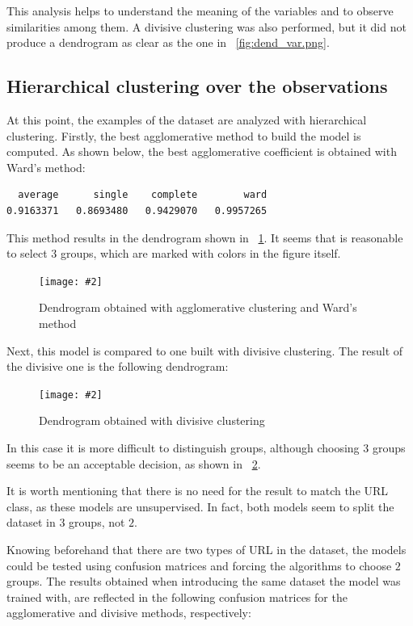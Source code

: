 \documentclass[12pt, a4paper]{article}
\newcommand*{\figref}[1]{\figurename~\ref{fig:#1}}
\newcommand{\figcaption}[4][H]{
  \begin{figure}[#1]
    \centering
    \texttt{[image: \#2]}
    \caption{#3}
    \label{fig:#2}
  \end{figure}
}
\begin{document}
      This analysis helps to understand the meaning of the variables and to observe similarities among them. A divisive clustering was also performed, but it did not produce a dendrogram as clear as the one in \figref{dend_var.png}.

    \subsection{Hierarchical clustering over the observations}

      At this point, the examples of the dataset are analyzed with hierarchical clustering. Firstly, the best agglomerative method to build the model is computed. As shown below, the best agglomerative coefficient is obtained with Ward's method:

      \begin{verbatim}
  average      single    complete        ward
0.9163371   0.8693480   0.9429070   0.9957265
      \end{verbatim}

      This method results in the dendrogram shown in \figref{ward.png}. It seems that is reasonable to select $3$ groups, which are marked with colors in the figure itself.

      \figcaption{ward.png}{Dendrogram obtained with agglomerative clustering and Ward's method}{1}

      Next, this model is compared to one built with divisive clustering. The result of the divisive one is the following dendrogram:

      \figcaption{diana.png}{Dendrogram obtained with divisive clustering}{1}

      \newpage

      In this case it is more difficult to distinguish groups, although choosing $3$ groups seems to be an acceptable decision, as shown in \figref{diana.png}.

      It is worth mentioning that there is no need for the result to match the URL class, as these models are unsupervised. In fact, both models seem to split the dataset in $3$ groups, not $2$.

      Knowing beforehand that there are two types of URL in the dataset, the models could be tested using confusion matrices and forcing the algorithms to choose $2$ groups. The results obtained when introducing the same dataset the model was trained with, are reflected in the following confusion matrices for the agglomerative and divisive methods, respectively:
\end{document}

